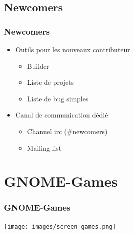 \documentclass{beamer}
\begin{document}
\begin{frame}
\end{frame}

\subsection{Newcomers}
\begin{frame}
  \frametitle{Newcomers}
  \begin{itemize}
  \item Outils pour les nouveaux contributeur \pause
    \begin{itemize}
    \item Builder
    \item Liste de projets
    \item Liste de bug simples \pause
    \end{itemize}
  \item Canal de communication dédié \pause
    \begin{itemize}
    \item Channel irc (\#newcomers)
    \item Mailing list
    \end{itemize}
  \end{itemize}
\end{frame}

\section{GNOME-Games}
\begin{frame}
  \frametitle{GNOME-Games}
  \texttt{[image: images/screen-games.png]}
\end{frame}
\end{document}
